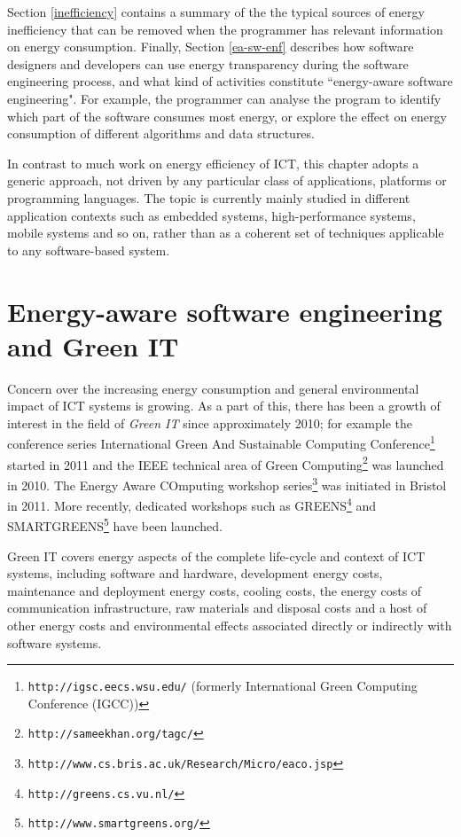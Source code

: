 \documentclass[11pt,oneside]{book}
\begin{document}
Section \ref{inefficiency} contains a summary of the the typical sources of energy inefficiency that can be removed when the programmer has relevant information on energy consumption.   Finally, Section \ref{ea-sw-enf} describes how software designers and developers can use energy transparency during the software engineering process, and what kind of activities constitute ``energy-aware software engineering".  For example, the programmer can analyse the program to identify which part of the software consumes most energy, or explore the effect on
energy consumption of different algorithms and data structures.

In contrast to much work on energy efficiency of ICT, this chapter adopts a generic approach, not driven by any particular class of applications, platforms or programming languages. The topic is currently mainly studied in different application contexts such as embedded systems, high-performance systems, mobile systems and so on, rather than as a coherent set of techniques applicable to any software-based system.

\section{Energy-aware software engineering and Green IT}
\label{greenit}
Concern over the increasing energy consumption and general environmental impact of ICT systems is growing.  As a part of this,
there has been a growth of interest in the field of \emph{Green IT}  \cite{KrauseCraigWood2010,DBLP:journals/stt/NaumannKD13,DBLP:journals/infsof/CapraFS12,DBLP:journals/stt/NaumannKD13,Mahmoud_Ahmad_2013} since approximately 2010; for example the conference series International Green And Sustainable Computing Conference\footnote{\texttt{http://igsc.eecs.wsu.edu/} (formerly International Green Computing Conference (IGCC))} started in 2011 and the IEEE technical area of Green Computing\footnote{\texttt{http://sameekhan.org/tagc/}} was launched in 2010.  The Energy Aware COmputing workshop series\footnote{\texttt{http://www.cs.bris.ac.uk/Research/Micro/eaco.jsp}} was initiated in Bristol in 2011.
More recently, dedicated workshops such as GREENS\footnote{\texttt{http://greens.cs.vu.nl/}} and SMARTGREENS\footnote{\texttt{http://www.smartgreens.org/}} have been launched. 

Green IT covers energy aspects of the complete life-cycle and context of ICT systems, including software and hardware, development energy costs, maintenance and deployment energy costs, cooling costs, the energy costs of communication infrastructure, raw materials and disposal costs and a host of other energy costs and environmental effects associated directly or indirectly with software systems. 
\end{document}
